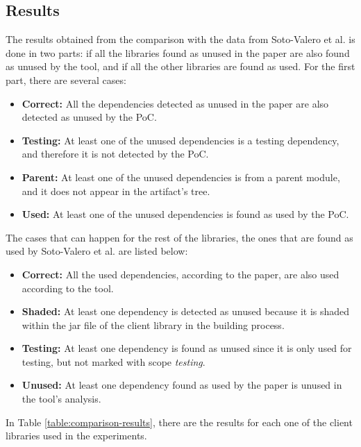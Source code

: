 \subsection{Results}

The results obtained from the comparison with the data from Soto-Valero et al. \cite{soto2020comprehensive} is done in two parts: if all the libraries found as unused in the paper are also found as unused by the tool, and if all the other libraries are found as used. For the first part, there are several cases:

\begin{itemize}
  \item \textbf{Correct:} All the dependencies detected as unused in the paper are also detected as unused by the PoC.
  \item \textbf{Testing:} At least one of the unused dependencies is a testing dependency, and therefore it is not detected by the PoC.
  \item \textbf{Parent:} At least one of the unused dependencies is from a parent module, and it does not appear in the artifact's tree.
  \item \textbf{Used:} At least one of the unused dependencies is found as used by the PoC.
\end{itemize}

The cases that can happen for the rest of the libraries, the ones that are found as used by Soto-Valero et al. are listed below:

\begin{itemize}
  \item \textbf{Correct:} All the used dependencies, according to the paper, are also used according to the tool.
  \item \textbf{Shaded:} At least one dependency is detected as unused because it is shaded within the jar file of the client library in the building process.
  \item \textbf{Testing:} At least one dependency is found as unused since it is only used for testing, but not marked with scope \textit{testing}.
  \item \textbf{Unused:} At least one dependency found as used by the paper is unused in the tool's analysis.
\end{itemize}

In Table \ref{table:comparison-results}, there are the results for each one of the client libraries used in the experiments.

